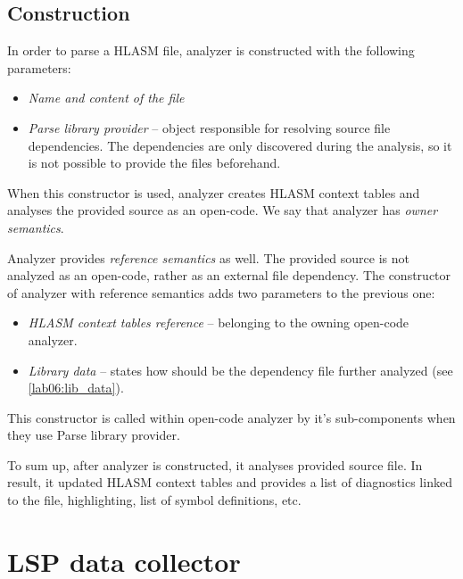 \subsection{Construction}

In order to parse a HLASM file, analyzer is constructed with the following parameters:
\begin{itemize}
	\item \emph{Name and content of the file}
	\item \emph{Parse library provider} -- object responsible for resolving source file dependencies. The dependencies are only discovered during the analysis, so it is not possible to provide the files beforehand.
\end{itemize}

When this constructor is used, analyzer creates HLASM context tables and analyses the provided source as an open-code. We say that analyzer has \emph{owner semantics}. 
 
Analyzer provides \emph{reference semantics} as well. The provided source is not analyzed as an open-code, rather as an external file dependency. The constructor of analyzer with reference semantics adds two parameters to the previous one:
\begin{itemize}
	\item \emph{HLASM context tables reference} -- belonging to the owning open-code analyzer.
	\item \emph{Library data} -- states how should be the dependency file further analyzed (see \cref{lab06:lib_data}).
\end{itemize}

This constructor is called within open-code analyzer by it's sub-components when they use Parse library provider.

\vspace{0.5cm}

To sum up, after analyzer is constructed, it analyses provided source file. In result, it updated HLASM context tables and provides a list of diagnostics linked to the file, highlighting, list of symbol definitions, etc.

\section{LSP data collector}




